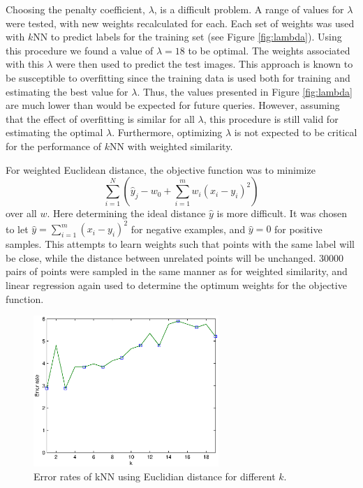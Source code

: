 \documentclass[10pt,twocolumn,letterpaper]{article}
\begin{document}
Choosing the penalty coefficient, $\lambda$, is a difficult problem. A range of values for $\lambda$ were tested, with new weights recalculated for each. Each set of weights was used with $k$NN to predict labels for the training set (see Figure \ref{fig:lambda}).
Using this procedure we found a value of $\lambda=18$ to be optimal.
The weights associated with this $\lambda$ were then used to predict the test images. This approach is known to be susceptible to overfitting since the training data is used both for training and estimating the best value for $\lambda$. Thus, the values presented in Figure \ref{fig:lambda} are much lower than would be expected for future queries. However, assuming that the effect of overfitting is similar for all $\lambda$, this procedure is still valid for estimating the optimal $\lambda$. Furthermore, optimizing $\lambda$ is not expected to be critical for the performance of $k$NN with weighted similarity.

For weighted Euclidean distance, the objective function was to minimize
\[ \sum_{i=1}^N \left( \hat{y}_j - w_0 + \sum_{i=1}^m w_i (x_i-y_i)^2 \right)\]
over all $w$.
Here determining the ideal distance $\hat{y}$ is more difficult. It was chosen to let $\hat{y} = \sum_{i=1}^m (x_i-y_i)^2 $ for negative examples, and $\hat{y}=0$ for positive samples. This attempts to learn weights such that points with the same label will be close, while the distance between unrelated points will be unchanged. 30000 pairs of points were sampled in the same manner as for weighted similarity, and linear regression again used to determine the optimum weights for the objective function.


\begin{figure}[htbp]
  \centering

    \begin{minipage}{7 cm}
      \includegraphics[width=7cm]{kerrorrate}
      \caption{Error rates of kNN using Euclidian distance for different $k$.}
      \label{kplots}
    \end{minipage}

\end{figure}
\end{document}
